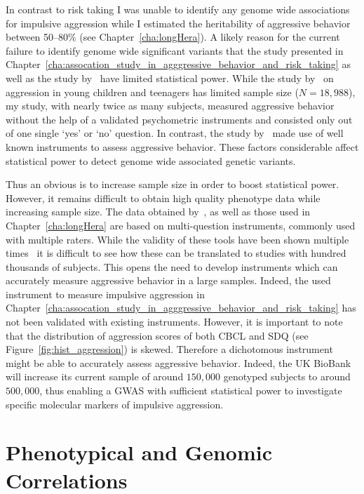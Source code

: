 In contrast to risk taking I was unable to identify any genome wide associations for impulsive aggression while I estimated the heritability of aggressive behavior between 50--80\% (see Chapter~\ref{cha:longHera}).
A likely reason for the current failure to identify genome wide significant variants that the study presented in Chapter~\ref{cha:assocation_study_in_agggressive_behavior_and_risk_taking} as well as the study by~\citet{Pappa2016a} have limited statistical power.
While the study by~\cite{Pappa2016a} on aggression in young children and teenagers  has limited sample size ($N=18,988$),
my study, with nearly twice as many subjects, measured aggressive behavior without the help of a validated psychometric instruments and consisted only out of one single `yes' or `no' question. 
In contrast, the study by~\citet{Pappa2016a} made use of well known instruments to assess aggressive behavior.
These factors considerable affect statistical power to detect genome wide associated genetic variants.

Thus an obvious is to increase sample size in order to boost statistical power.
However, it remains difficult to obtain high quality phenotype data while increasing sample size.
The data obtained by~\citet{Pappa2016a}, as well as those used in Chapter~\ref{cha:longHera} are based on multi-question instruments, commonly used with multiple raters.
While the validity of these tools have been shown multiple times~\cite{Goodman1997,Goodman2001,Achenbach2003} it is difficult to see how these can be translated to studies with hundred thousands of subjects.
This opens the need to develop instruments which can accurately measure aggressive behavior in a large samples.  
Indeed, the used instrument to measure impulsive aggression in Chapter~\ref{cha:assocation_study_in_agggressive_behavior_and_risk_taking} has not been validated with existing instruments.
However, it is important to note that the distribution of aggression scores of both CBCL and SDQ (see Figure~\ref{fig:hist_aggression}) is skewed.
Therefore a dichotomous instrument might be able to accurately assess aggressive behavior. 
Indeed, the UK BioBank will increase its current sample of around $150,000$ genotyped subjects to around $500,000$, thus enabling a GWAS with sufficient statistical power to investigate specific molecular markers of impulsive aggression.  

\section{Phenotypical and Genomic Correlations}
\label{sec:phenotypical_and_genomic_correlations}

